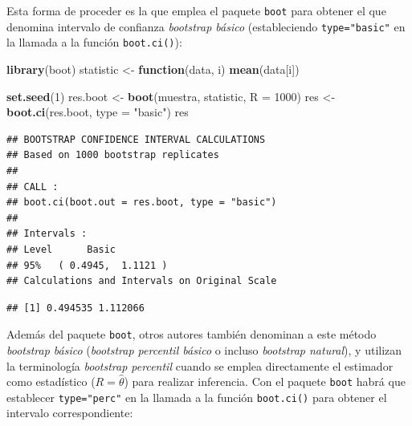 \documentclass[]{book}
\newenvironment{Shaded}{\begin{snugshade}}{\end{snugshade}}
\newcommand{\KeywordTok}[1]{\textcolor[rgb]{0.13,0.29,0.53}{\textbf{#1}}}
\newcommand{\DataTypeTok}[1]{\textcolor[rgb]{0.13,0.29,0.53}{#1}}
\newcommand{\DecValTok}[1]{\textcolor[rgb]{0.00,0.00,0.81}{#1}}
\newcommand{\StringTok}[1]{\textcolor[rgb]{0.31,0.60,0.02}{#1}}
\newcommand{\ControlFlowTok}[1]{\textcolor[rgb]{0.13,0.29,0.53}{\textbf{#1}}}
\newcommand{\OperatorTok}[1]{\textcolor[rgb]{0.81,0.36,0.00}{\textbf{#1}}}
\newcommand{\NormalTok}[1]{#1}
\theoremstyle{definition}
\theoremstyle{definition}
\theoremstyle{definition}
\theoremstyle{remark}
\begin{document}
Esta forma de proceder es la que emplea el paquete \texttt{boot} para
obtener el que denomina intervalo de confianza \emph{bootstrap básico}
(estableciendo \texttt{type="basic"} en la llamada a la función
\texttt{boot.ci()}):

\begin{Shaded}
\begin{Highlighting}[]
\KeywordTok{library}\NormalTok{(boot)}
\NormalTok{statistic <-}\StringTok{ }\ControlFlowTok{function}\NormalTok{(data, i) }\KeywordTok{mean}\NormalTok{(data[i])}

\KeywordTok{set.seed}\NormalTok{(}\DecValTok{1}\NormalTok{)}
\NormalTok{res.boot <-}\StringTok{ }\KeywordTok{boot}\NormalTok{(muestra, statistic, }\DataTypeTok{R =} \DecValTok{1000}\NormalTok{)}
\NormalTok{res <-}\StringTok{ }\KeywordTok{boot.ci}\NormalTok{(res.boot, }\DataTypeTok{type =} \StringTok{"basic"}\NormalTok{)}
\NormalTok{res}
\end{Highlighting}
\end{Shaded}

\begin{verbatim}
## BOOTSTRAP CONFIDENCE INTERVAL CALCULATIONS
## Based on 1000 bootstrap replicates
## 
## CALL : 
## boot.ci(boot.out = res.boot, type = "basic")
## 
## Intervals : 
## Level      Basic         
## 95%   ( 0.4945,  1.1121 )  
## Calculations and Intervals on Original Scale
\end{verbatim}

\begin{Shaded}
\end{Shaded}

\begin{verbatim}
## [1] 0.494535 1.112066
\end{verbatim}

Además del paquete \texttt{boot}, otros autores también denominan a este
método \emph{bootstrap básico} (\emph{bootstrap percentil básico} o
incluso \emph{bootstrap natural}), y utilizan la terminología
\emph{bootstrap percentil} cuando se emplea directamente el estimador
como estadístico (\(R = \hat \theta\)) para realizar inferencia. Con el
paquete \texttt{boot} habrá que establecer \texttt{type="perc"} en la
llamada a la función \texttt{boot.ci()} para obtener el intervalo
correspondiente:
\end{document}
